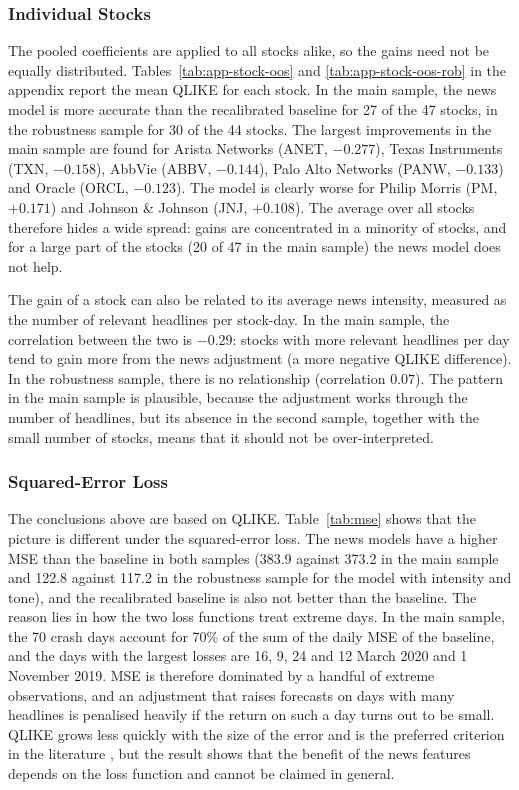 \documentclass[12pt,a4paper]{article}
\begin{document}
\subsubsection{Individual Stocks}\label{sec:results-stocks}
The pooled coefficients are applied to all stocks alike, so the gains need not be equally distributed. Tables~\ref{tab:app-stock-oos} and \ref{tab:app-stock-oos-rob} in the appendix report the mean QLIKE for each stock. In the main sample, the news model is more accurate than the recalibrated baseline for 27 of the 47 stocks, in the robustness sample for 30 of the 44 stocks. The largest improvements in the main sample are found for Arista Networks (ANET, $-0.277$), Texas Instruments (TXN, $-0.158$), AbbVie (ABBV, $-0.144$), Palo Alto Networks (PANW, $-0.133$) and Oracle (ORCL, $-0.123$). The model is clearly worse for Philip Morris (PM, $+0.171$) and Johnson \& Johnson (JNJ, $+0.108$). The average over all stocks therefore hides a wide spread: gains are concentrated in a minority of stocks, and for a large part of the stocks (20 of 47 in the main sample) the news model does not help.

The gain of a stock can also be related to its average news intensity, measured as the number of relevant headlines per stock-day. In the main sample, the correlation between the two is $-0.29$: stocks with more relevant headlines per day tend to gain more from the news adjustment (a more negative QLIKE difference). In the robustness sample, there is no relationship (correlation $0.07$). The pattern in the main sample is plausible, because the adjustment works through the number of headlines, but its absence in the second sample, together with the small number of stocks, means that it should not be over-interpreted.

\subsubsection{Squared-Error Loss}\label{sec:results-mse}
The conclusions above are based on QLIKE. Table~\ref{tab:mse} shows that the picture is different under the squared-error loss. The news models have a higher MSE than the baseline in both samples (383.9 against 373.2 in the main sample and 122.8 against 117.2 in the robustness sample for the model with intensity and tone), and the recalibrated baseline is also not better than the baseline. The reason lies in how the two loss functions treat extreme days. In the main sample, the 70 crash days account for 70\% of the sum of the daily MSE of the baseline, and the days with the largest losses are 16, 9, 24 and 12 March 2020 and 1 November 2019. MSE is therefore dominated by a handful of extreme observations, and an adjustment that raises forecasts on days with many headlines is penalised heavily if the return on such a day turns out to be small. QLIKE grows less quickly with the size of the error and is the preferred criterion in the literature \parencite{patton2011}, but the result shows that the benefit of the news features depends on the loss function and cannot be claimed in general.
\end{document}
